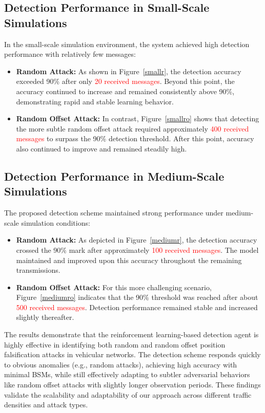 \documentclass[conference]{IEEEtran}
\begin{document}
\subsection{Detection Performance in Small-Scale Simulations}

In the small-scale simulation environment, the system achieved high detection performance with relatively few messages:

\begin{itemize}
    \item \textbf{Random Attack:} As shown in Figure~\ref{smallr}, the detection accuracy exceeded 90\% after only \textcolor{red}{20 received messages}. Beyond this point, the accuracy continued to increase and remained consistently above 90\%, demonstrating rapid and stable learning behavior.
    
    \item \textbf{Random Offset Attack:} In contrast, Figure~\ref{smallro} shows that detecting the more subtle random offset attack required approximately \textcolor{red}{400 received messages} to surpass the 90\% detection threshold. After this point, accuracy also continued to improve and remained steadily high.
\end{itemize}

\subsection{Detection Performance in Medium-Scale Simulations}

The proposed detection scheme maintained strong performance under medium-scale simulation conditions:

\begin{itemize}
    \item \textbf{Random Attack:} As depicted in Figure~\ref{mediumr}, the detection accuracy crossed the 90\% mark after approximately \textcolor{red}{100 received messages}. The model maintained and improved upon this accuracy throughout the remaining transmissions.
    
    \item \textbf{Random Offset Attack:} For this more challenging scenario, Figure~\ref{mediumro} indicates that the 90\% threshold was reached after about \textcolor{red}{500 received messages}. Detection performance remained stable and increased slightly thereafter.
\end{itemize}


The results demonstrate that the reinforcement learning-based detection agent is highly effective in identifying both random and random offset position falsification attacks in vehicular networks. The detection scheme responds quickly to obvious anomalies (e.g., random attacks), achieving high accuracy with minimal BSMs, while still effectively adapting to subtler adversarial behaviors like random offset attacks with slightly longer observation periods. These findings validate the scalability and adaptability of our approach across different traffic densities and attack types.
\end{document}

